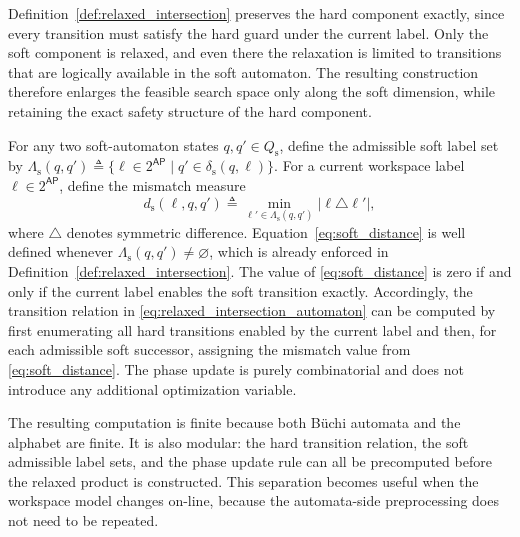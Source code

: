 Definition~\ref{def:relaxed_intersection} preserves the hard component exactly,
since every transition must satisfy the hard guard under the current label.
Only the soft component is relaxed, and even there the relaxation is limited to
transitions that are logically available in the soft automaton. The resulting
construction therefore enlarges the feasible search space only along the soft
dimension, while retaining the exact safety structure of the hard component.

For any two soft-automaton states $q,q' \in Q_{\mathrm{s}}$, define the
admissible soft label set by
$\Lambda_{\mathrm{s}}(q,q') \triangleq
\{\ell \in 2^{\mathsf{AP}} \mid q' \in \delta_{\mathrm{s}}(q,\ell)\}$.
For a current workspace label $\ell \in 2^{\mathsf{AP}}$, define the mismatch
measure
\begin{equation}
d_{\mathrm{s}}(\ell,q,q') \triangleq
\min_{\ell' \in \Lambda_{\mathrm{s}}(q,q')} |\ell \triangle \ell'|,
\label{eq:soft_distance}
\end{equation}
where $\triangle$ denotes symmetric difference.
Equation~\eqref{eq:soft_distance} is well defined whenever
$\Lambda_{\mathrm{s}}(q,q') \neq \varnothing$, which is already enforced in
Definition~\ref{def:relaxed_intersection}. The value of
\eqref{eq:soft_distance} is zero if and only if the current label enables the
soft transition exactly. Accordingly, the transition relation in
\eqref{eq:relaxed_intersection_automaton} can be computed by first enumerating
all hard transitions enabled by the current label and then, for each admissible
soft successor, assigning the mismatch value from
\eqref{eq:soft_distance}. The phase update is purely combinatorial and does not
introduce any additional optimization variable.

The resulting computation is finite because both B\"uchi automata and the
alphabet are finite. It is also modular: the hard transition relation, the soft
admissible label sets, and the phase update rule can all be precomputed before
the relaxed product is constructed. This separation becomes useful when the
workspace model changes on-line, because the automata-side preprocessing does
not need to be repeated.

